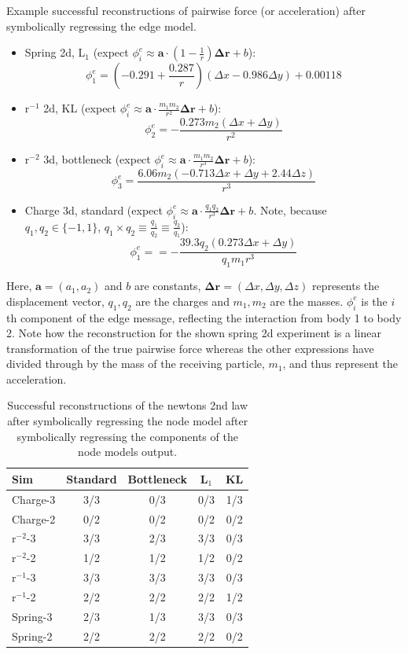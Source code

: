 \documentclass[11pt]{article}
\begin{document}
    \noindent Example successful reconstructions of pairwise force (or acceleration) after symbolically regressing the edge model.
    \begin{itemize}
        \item
        Spring 2d, L$_1$ (expect $\phi^{e}_i \approx \mathbf{a} \cdot (1-\frac{1}{r}) \mathbf{\Delta {r}} + b$):
        $$
        \phi^{e}_1 = (-0.291 + \frac{0.287}{r})(\Delta x - 0.986 \Delta y) + 0.00118
        $$
        \item 
        r$^{-1}$ 2d, KL (expect $\phi^{e}_i \approx \mathbf{a} \cdot \frac{m_1 m_2}{r^2} \mathbf{\Delta r} + b$):
        $$\phi^{e}_2 = -\frac{0.273m_2(\Delta x + \Delta y)}{r^2}$$
        \item 
        r$^{-2}$ 3d, bottleneck (expect $\phi^{e}_i \approx \mathbf{a} \cdot \frac{m_1 m_2}{r^3} \mathbf{\Delta r} + b$):
        $$\phi^{e}_3 = \frac{6.06m_2(-0.713\Delta x + \Delta y + 2.44\Delta z)}{r^3}$$
        \item 
        Charge 3d, standard (expect $\phi^{e}_i \approx \mathbf{a} \cdot \frac{q_1 q_2}{r^3} \mathbf{\Delta r} + b$. Note, because $q_1, q_2 \in \{-1, 1\}$, $q_1 \times q_2 \equiv \frac{q_1}{q_2} \equiv \frac{q_2}{q_1}$):
        $$\phi^{e}_1 = = -\frac{39.3q_2(0.273\Delta x + \Delta y)}{ q_1 m_1r^3}$$
    \end{itemize}
    Here, $\mathbf{a} = (a_1, a_2)$ and $b$ are constants, $\mathbf{\Delta r} = (\Delta x, \Delta y, \Delta z)$ represents the displacement vector, $q_1, q_2$ are the charges and $m_1, m_2$ are the masses. $\phi^{e}_i$ is the $i$th component of the edge message, reflecting the interaction from body 1 to body 2. Note how the reconstruction for the shown spring 2d experiment is a linear transformation of the true pairwise force whereas the other expressions have divided through by the mass of the receiving particle, $m_1$, and thus represent the acceleration.
    \begin{table}[H]
        \centering
        \begin{tabular}{lcccc}
        \hline
        Sim & Standard & Bottleneck & L$_1$ & KL \\
        \hline
        Charge-3 & 3/3 & 0/3 & 0/3 & 1/3 \\
        Charge-2 & 0/2 & 0/2 & 0/2 & 0/2 \\
        r$^{-2}$-3 & 3/3 & 2/3 & 3/3 & 0/3 \\
        r$^{-2}$-2 & 1/2 & 1/2 & 1/2 & 0/2 \\
        r$^{-1}$-3 & 3/3 & 3/3 & 3/3 & 0/3 \\
        r$^{-1}$-2 & 2/2 & 2/2 & 2/2 & 1/2 \\
        Spring-3 & 2/3 & 1/3 & 3/3  & 0/3 \\
        Spring-2 & 2/2 & 2/2 & 2/2 & 0/2 \\
        \hline
        \end{tabular}
        \caption{Successful reconstructions of the newtons 2nd law after symbolically regressing the node model after symbolically regressing the components of the node models output.}
        \label{tab:sr_edge_model_table}
    \end{table}
\end{document}
